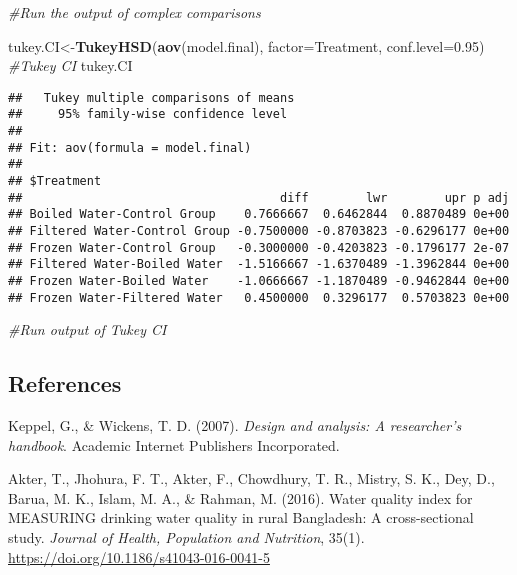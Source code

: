 \documentclass[12pt,]{article}
\newenvironment{Shaded}{\begin{snugshade}}{\end{snugshade}}
\newcommand{\CommentTok}[1]{\textcolor[rgb]{0.56,0.35,0.01}{\textit{#1}}}
\newcommand{\DataTypeTok}[1]{\textcolor[rgb]{0.13,0.29,0.53}{#1}}
\newcommand{\FloatTok}[1]{\textcolor[rgb]{0.00,0.00,0.81}{#1}}
\newcommand{\KeywordTok}[1]{\textcolor[rgb]{0.13,0.29,0.53}{\textbf{#1}}}
\newcommand{\NormalTok}[1]{#1}
\begin{document}
\begin{Shaded}
\begin{Highlighting}[]
\CommentTok{#Run the output of complex comparisons}
\end{Highlighting}
\end{Shaded}

\begin{Shaded}
\begin{Highlighting}[]
\NormalTok{tukey.CI<-}\KeywordTok{TukeyHSD}\NormalTok{(}\KeywordTok{aov}\NormalTok{(model.final), }\DataTypeTok{factor=}\NormalTok{Treatment, }\DataTypeTok{conf.level=}\FloatTok{0.95}\NormalTok{)}
\CommentTok{#Tukey CI}
\NormalTok{tukey.CI}
\end{Highlighting}
\end{Shaded}

\begin{verbatim}
##   Tukey multiple comparisons of means
##     95% family-wise confidence level
## 
## Fit: aov(formula = model.final)
## 
## $Treatment
##                                    diff        lwr        upr p adj
## Boiled Water-Control Group    0.7666667  0.6462844  0.8870489 0e+00
## Filtered Water-Control Group -0.7500000 -0.8703823 -0.6296177 0e+00
## Frozen Water-Control Group   -0.3000000 -0.4203823 -0.1796177 2e-07
## Filtered Water-Boiled Water  -1.5166667 -1.6370489 -1.3962844 0e+00
## Frozen Water-Boiled Water    -1.0666667 -1.1870489 -0.9462844 0e+00
## Frozen Water-Filtered Water   0.4500000  0.3296177  0.5703823 0e+00
\end{verbatim}

\begin{Shaded}
\begin{Highlighting}[]
\CommentTok{#Run output of Tukey CI}
\end{Highlighting}
\end{Shaded}

\newpage

\hypertarget{references}{%
\subsection{References}\label{references}}

Keppel, G., \& Wickens, T. D. (2007). \emph{Design and analysis: A
researcher's handbook}. Academic Internet Publishers Incorporated.

Akter, T., Jhohura, F. T., Akter, F., Chowdhury, T. R., Mistry, S. K.,
Dey, D., Barua, M. K., Islam, M. A., \& Rahman, M. (2016). Water quality
index for MEASURING drinking water quality in rural Bangladesh: A
cross-sectional study. \emph{Journal of Health, Population and
Nutrition}, 35(1). \url{https://doi.org/10.1186/s41043-016-0041-5}
\end{document}
